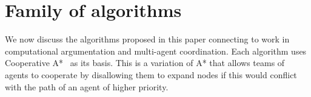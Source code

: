 \section{Family of algorithms}\label{sec:method}
We now discuss the algorithms proposed in this paper connecting to work in 
computational argumentation and multi-agent coordination. Each algorithm uses 
Cooperative A*~\cite{silver2005} as its basis. This is a variation of A* 
\cite{hart1968} that allows teams of agents to cooperate by disallowing them to 
expand nodes if this would conflict with the path of an agent of higher 
priority.


